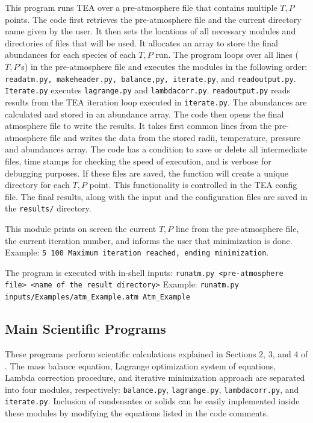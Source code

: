 This program runs TEA over a pre-atmosphere file that contains
multiple ${T,P}$ points.  The code first retrieves the pre-atmosphere
file and the current directory name given by the user. It then sets
the locations of all necessary modules and directories of files that
will be used. It allocates an array to store the final abundances for
each species of each $T, P$ run. The program loops over all lines
(${T, P}$'s) in the pre-atmosphere file and executes the modules in
the following order: \texttt{readatm.py, makeheader.py, balance,py,
iterate.py}, and \texttt{readoutput.py}. \texttt{Iterate.py}
executes \texttt{lagrange.py}
and \texttt{lambdacorr.py}. \texttt{readoutput.py} reads results from
the TEA iteration loop executed in \texttt{iterate.py}. The abundances
are calculated and stored in an abundance array. The code then opens
the final atmosphere file to write the results. It takes first common
lines from the pre-atmosphere file and writes the data from the stored
radii, temperature, pressure and abundances array. The code has a
condition to save or delete all intermediate files, time stamps for
checking the speed of execution, and is verbose for debugging
purposes. If these files are saved, the function will create a unique
directory for each ${T, P}$ point. This functionality is controlled in
the TEA config file. The final results, along with the input and the
configuration files are saved in the \texttt{results/} directory.

This module prints on screen the current ${T, P}$ line from the
pre-atmosphere file, the current iteration number, and informs the
user that minimization is done.  Example: \texttt{5 100 Maximum
iteration reached, ending minimization}.

The program is executed with in-shell inputs:\newline
\texttt{runatm.py <pre-atmosphere file> <name of the result directory>}\newline
Example: \texttt{runatm.py inputs/Examples/atm\_Example.atm
Atm\_Example}



\subsection{Main Scientific Programs}

These programs perform scientific calculations explained in Sections
2, 3, and 4 of \citet{BlecicEtal2016-TEAtheory}. The mass balance
equation, Lagrange optimization system of equations, Lambda correction
procedure, and iterative minimization approach are separated into four
modules,
respectively: \texttt{balance.py}, \texttt{lagrange.py}, \texttt{lambdacorr.py},
and \texttt{iterate.py}. Inclusion of condensates or solids can be
easily implemented inside these modules by modifying the equations
listed in the code comments.

